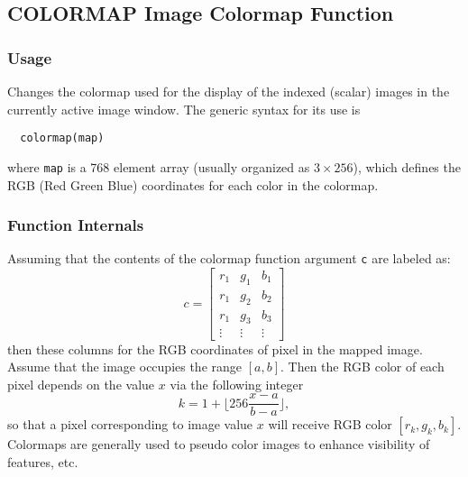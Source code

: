 %
%
%
\subsection{COLORMAP Image Colormap Function}
\subsubsection{Usage}
Changes the colormap used for the display of the indexed (scalar) images in
the currently active image window.  The generic syntax for its use is
\begin{verbatim}
  colormap(map)
\end{verbatim}
where \verb|map| is a 768 element array (usually organized as $3 \times 256$),
which defines the RGB (Red Green Blue) coordinates for each color in the
colormap.
\subsubsection{Function Internals}
Assuming that the contents of the colormap function argument \verb|c| are 
labeled as:
\[
  c = \begin{bmatrix}
    r_1 & g_1 & b_1 \\
    r_1 & g_2 & b_2 \\
    r_1 & g_3 & b_3 \\
    \vdots & \vdots & \vdots 
      \end{bmatrix} 
\]
then these columns for the RGB coordinates of pixel in the mapped image.
Assume that the image occupies the range $[a,b]$.  Then the RGB color 
of each pixel depends on the value $x$ via the following integer
\[
  k = 1 + \lfloor 256 \frac{x-a}{b-a} \rfloor,
\]
so that a pixel corresponding to image value $x$ will receive RGB color 
$[r_k,g_k,b_k]$.
Colormaps are generally used to pseudo color images to enhance 
visibility of features, etc.
